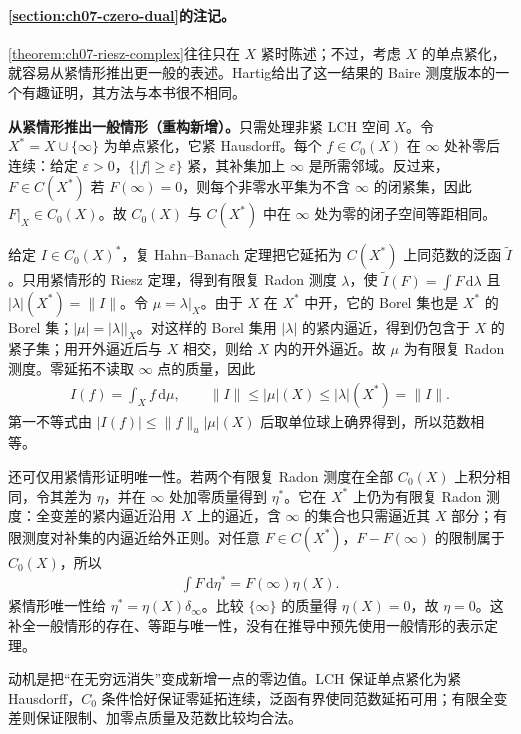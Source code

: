 \documentclass[../../main.tex]{subfiles}
\begin{document}
\paragraph*{\cref{section:ch07-czero-dual}的注记。}
\cref{theorem:ch07-riesz-complex}往往只在 $X$ 紧时陈述；不过，考虑 $X$ 的单点紧化，就容易从紧情形推出更一般的表述。Hartig\cite{folland-bib-066}给出了这一结果的 Baire 测度版本的一个有趣证明，其方法与本书很不相同。
\begin{remark}
\textbf{从紧情形推出一般情形（重构新增）。}只需处理非紧 LCH 空间 $X$。令 $X^*=X\cup\{\infty\}$ 为单点紧化，它紧 Hausdorff。每个 $f\in C_0(X)$ 在 $\infty$ 处补零后连续：给定 $\varepsilon>0$，$\{|f|\geqslant\varepsilon\}$ 紧，其补集加上 $\infty$ 是所需邻域。反过来，$F\in C(X^*)$ 若 $F(\infty)=0$，则每个非零水平集为不含 $\infty$ 的闭紧集，因此 $F|_X\in C_0(X)$。故 $C_0(X)$ 与 $C(X^*)$ 中在 $\infty$ 处为零的闭子空间等距相同。

给定 $I\in C_0(X)^*$，复 Hahn--Banach 定理把它延拓为 $C(X^*)$ 上同范数的泛函 $\widetilde I$。只用紧情形的 Riesz 定理，得到有限复 Radon 测度 $\lambda$，使 $\widetilde I(F)=\int F\,\mathrm d\lambda$ 且 $|\lambda|(X^*)=\|I\|$。令 $\mu=\lambda|_X$。由于 $X$ 在 $X^*$ 中开，它的 Borel 集也是 $X^*$ 的 Borel 集；$|\mu|=|\lambda||_X$。对这样的 Borel 集用 $|\lambda|$ 的紧内逼近，得到仍包含于 $X$ 的紧子集；用开外逼近后与 $X$ 相交，则给 $X$ 内的开外逼近。故 $\mu$ 为有限复 Radon 测度。零延拓不读取 $\infty$ 点的质量，因此
\begin{align*}
I(f)=\int_X f\,\mathrm d\mu,\qquad
\|I\|\leqslant|\mu|(X)\leqslant|\lambda|(X^*)=\|I\|.
\end{align*}
第一不等式由 $|I(f)|\leqslant\|f\|_u|\mu|(X)$ 后取单位球上确界得到，所以范数相等。

还可仅用紧情形证明唯一性。若两个有限复 Radon 测度在全部 $C_0(X)$ 上积分相同，令其差为 $\eta$，并在 $\infty$ 处加零质量得到 $\eta^*$。它在 $X^*$ 上仍为有限复 Radon 测度：全变差的紧内逼近沿用 $X$ 上的逼近，含 $\infty$ 的集合也只需逼近其 $X$ 部分；有限测度对补集的内逼近给外正则。对任意 $F\in C(X^*)$，$F-F(\infty)$ 的限制属于 $C_0(X)$，所以
\begin{align*}
\int F\,\mathrm d\eta^*=F(\infty)\eta(X).
\end{align*}
紧情形唯一性给 $\eta^*=\eta(X)\delta_\infty$。比较 $\{\infty\}$ 的质量得 $\eta(X)=0$，故 $\eta=0$。这补全一般情形的存在、等距与唯一性，没有在推导中预先使用一般情形的表示定理。

动机是把“在无穷远消失”变成新增一点的零边值。LCH 保证单点紧化为紧 Hausdorff，$C_0$ 条件恰好保证零延拓连续，泛函有界使同范数延拓可用；有限全变差则保证限制、加零点质量及范数比较均合法。
\end{remark}

\end{document}
